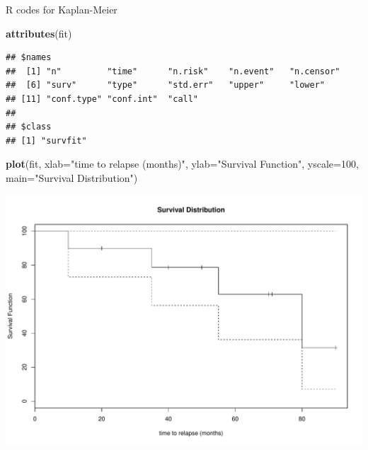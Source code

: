 \documentclass[ignorenonframetext,]{beamer}
\newenvironment{Shaded}{\begin{snugshade}}{\end{snugshade}}
\newcommand{\KeywordTok}[1]{\textcolor[rgb]{0.13,0.29,0.53}{\textbf{{#1}}}}
\newcommand{\DataTypeTok}[1]{\textcolor[rgb]{0.13,0.29,0.53}{{#1}}}
\newcommand{\DecValTok}[1]{\textcolor[rgb]{0.00,0.00,0.81}{{#1}}}
\newcommand{\StringTok}[1]{\textcolor[rgb]{0.31,0.60,0.02}{{#1}}}
\newcommand{\NormalTok}[1]{{#1}}
\begin{document}
\begin{frame}[fragile]{R codes for Kaplan-Meier}
\begin{Shaded}
\begin{Highlighting}[]
\KeywordTok{attributes}\NormalTok{(fit)}
\end{Highlighting}
\end{Shaded}

\begin{verbatim}
## $names
##  [1] "n"         "time"      "n.risk"    "n.event"   "n.censor" 
##  [6] "surv"      "type"      "std.err"   "upper"     "lower"    
## [11] "conf.type" "conf.int"  "call"     
## 
## $class
## [1] "survfit"
\end{verbatim}

\end{frame}

\begin{frame}[fragile]

\begin{Shaded}
\begin{Highlighting}[]
\KeywordTok{plot}\NormalTok{(fit, }\DataTypeTok{xlab=}\StringTok{"time to relapse (months)"}\NormalTok{, }\DataTypeTok{ylab=}\StringTok{"Survival Function"}\NormalTok{, }\DataTypeTok{yscale=}\DecValTok{100}\NormalTok{, }\DataTypeTok{main=}\StringTok{"Survival Distribution"}\NormalTok{)}
\end{Highlighting}
\end{Shaded}

\includegraphics{survival_analysis_files/figure-beamer/unnamed-chunk-3-1.pdf}

\end{frame}
\end{document}
